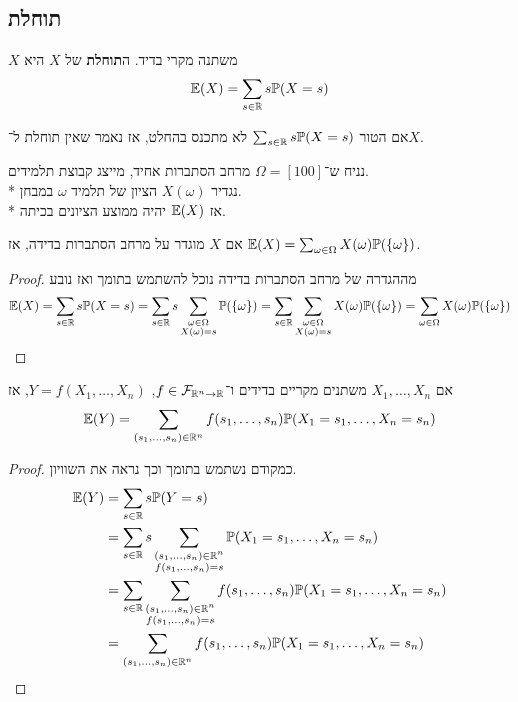 \subsection{תוחלת}
\begin{definition}
	$X$ משתנה מקרי בדיד.
	ה\textbf{תוחלת} של $X$ היא
	\[
		\mathbb{E}(X) = \sum_{s \in \mathbb{R}} s \mathbb{P}(X = s)
	\]
\end{definition}
\begin{remark}
	אם הטור $\sum_{s \in \mathbb{R}} s \mathbb{P}(X = s)$ לא מתכנס בהחלט, אז נאמר שאין תוחלת ל־$X$.
\end{remark}
\begin{example}
	נניח ש־$\Omega = [100]$ מרחב הסתברות אחיד, מייצג קבוצת תלמידים. \\*
	נגדיר $X(\omega)$ הציון של תלמיד $\omega$ במבחן. \\*
	אז $\mathbb{E}(X)$ יהיה ממוצע הציונים בכיתה.
\end{example}
\begin{proposition}
	אם $X$ מוגדר על מרחב הסתברות בדידה, אז $\mathbb{E}(X) = \sum_{\omega \in \Omega} X(\omega) \mathbb{P}(\{\omega\})$.
\end{proposition}
\begin{proof}
	מההגדרה של מרחב הסתברות בדידה נוכל להשתמש בתומך ואז נובע
	\[
		\mathbb{E}(X)
		= \sum_{s \in \mathbb{R}} s \mathbb{P}(X = s)
		= \sum_{s \in \mathbb{R}} s \sum_{\substack{\omega \in \Omega \\ X(\omega) = s}} \mathbb{P}(\{\omega\})
		= \sum_{s \in \mathbb{R}} \sum_{\substack{\omega \in \Omega \\ X(\omega) = s}} X(\omega) \mathbb{P}(\{\omega\})
		= \sum_{\omega \in \Omega} X(\omega) \mathbb{P}(\{\omega\})
	\]
\end{proof}
\begin{proposition}
	אם $X_1, \dots, X_n$ משתנים מקריים בדידים ו־$f \in \mathcal{F}_{\mathbb{R}^n \to \mathbb{R}}$, $Y = f(X_1, \dots, X_n)$, אז
	\[
		\mathbb{E}(Y) = \sum_{(s_1, \dots, s_n) \in \mathbb{R}^n} f(s_1, \dots, s_n) \mathbb{P}(X_1 = s_1, \dots, X_n = s_n)
	\]
\end{proposition}
\begin{proof}
	כמקודם נשתמש בתומך וכך נראה את השוויון.
	\begin{align*}
		\mathbb{E}(Y)
		& = \sum_{s \in \mathbb{R}} s \mathbb{P}(Y = s) \\
		& = \sum_{s \in \mathbb{R}} s \sum_{\substack{(s_1, \dots, s_n) \in \mathbb{R}^n \\ f(s_1, \dots, s_n) = s}} \mathbb{P}(X_1 = s_1, \dots, X_n = s_n) \\
		& = \sum_{s \in \mathbb{R}} \sum_{\substack{(s_1, \dots, s_n) \in \mathbb{R}^n \\ f(s_1, \dots, s_n) = s}} f(s_1, \dots, s_n) \mathbb{P}(X_1 = s_1, \dots, X_n = s_n) \\
		& = \sum_{(s_1, \dots, s_n) \in \mathbb{R}^n} f(s_1, \dots, s_n) \mathbb{P}(X_1 = s_1, \dots, X_n = s_n)
	\end{align*}
\end{proof}
